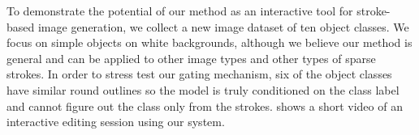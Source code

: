 To demonstrate the potential of our method as an interactive tool for stroke-based image generation, we collect a new image dataset of ten object classes. We focus on simple objects on white backgrounds, although we believe our method is general and can be applied to other image types and other types of sparse strokes. In order to stress test our gating mechanism, six  of the object classes have similar round outlines so the model is truly conditioned on the class label and cannot figure out the class only from the strokes.  shows a short video of an interactive editing session using our system.



